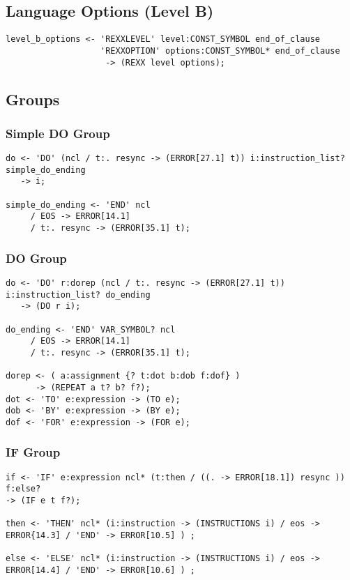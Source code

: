 \subsection{Language Options (Level B)}

\begin{verbatim}
level_b_options <- 'REXXLEVEL' level:CONST_SYMBOL end_of_clause
                   'REXXOPTION' options:CONST_SYMBOL* end_of_clause
                    -> (REXX level options);
\end{verbatim}

\subsection{Groups}

\subsubsection{Simple DO Group}

\begin{verbatim}
do <- 'DO' (ncl / t:. resync -> (ERROR[27.1] t)) i:instruction_list? simple_do_ending 
   -> i;

simple_do_ending <- 'END' ncl 
	 / EOS -> ERROR[14.1]
	 / t:. resync -> (ERROR[35.1] t);
\end{verbatim}

\subsubsection{DO Group}

\begin{verbatim}
do <- 'DO' r:dorep (ncl / t:. resync -> (ERROR[27.1] t)) i:instruction_list? do_ending 
   -> (DO r i);

do_ending <- 'END' VAR_SYMBOL? ncl 
	 / EOS -> ERROR[14.1]
	 / t:. resync -> (ERROR[35.1] t);

dorep <- ( a:assignment {? t:dot b:dob f:dof} ) 
      -> (REPEAT a t? b? f?);
dot <- 'TO' e:expression -> (TO e);
dob <- 'BY' e:expression -> (BY e);
dof <- 'FOR' e:expression -> (FOR e);
\end{verbatim}

\subsubsection{IF Group}

\begin{verbatim}
if <- 'IF' e:expression ncl* (t:then / ((. -> ERROR[18.1]) resync )) f:else? 
-> (IF e t f?);

then <- 'THEN' ncl* (i:instruction -> (INSTRUCTIONS i) / eos -> ERROR{14.3] / 'END' -> ERROR[10.5] ) ;

else <- 'ELSE' ncl* (i:instruction -> (INSTRUCTIONS i) / eos -> ERROR[14.4] / 'END' -> ERROR[10.6] ) ;
\end{verbatim}

